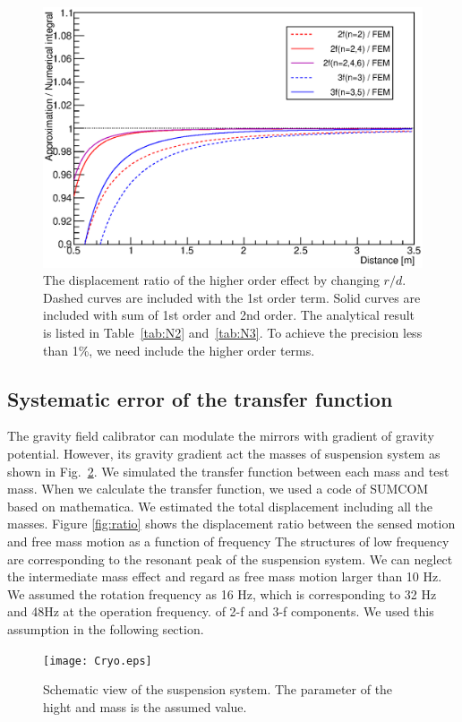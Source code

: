 \documentclass[A4]{spie}  %
\begin{document}
\begin{figure}
\begin{center}
\includegraphics[width=12cm]{dvsx_ratio.eps}
\caption{The displacement ratio of the higher order effect by changing $r/d$. Dashed curves are included with the 1st order term. Solid curves are included with sum of 1st order and 2nd order. The analytical result is listed in Table~\ref{tab:N2} and~\ref{tab:N3}. To achieve the precision less than 1\%, we need include the higher order terms.}
\label{fig:FEM}
\end{center}
\end{figure}


\subsection{Systematic error of the transfer function}
The gravity field calibrator can modulate the mirrors with gradient of gravity potential. However, its gravity gradient act the masses of suspension system as shown in Fig.~\ref{fig:cryo}. We simulated the transfer function between each mass and test mass. When we calculate the transfer function, we used a code of SUMCOM based on mathematica. We estimated the total displacement including all the masses. Figure \ref{fig:ratio} shows the displacement ratio between the sensed motion and free mass motion as a function of frequency The structures of low frequency are corresponding to the resonant peak of the suspension system. We can neglect the intermediate mass effect and regard as free mass motion larger than 10 Hz. We assumed the rotation frequency as 16 Hz, which is corresponding to 32 Hz and 48Hz at the operation frequency. of 2-f and 3-f components.  We used this assumption in the following section.
\begin{figure}
\begin{center}
\texttt{[image: Cryo.eps]}
\caption{Schematic view of the suspension system. The parameter of the hight and mass is the assumed value. }
\label{fig:cryo}
\end{center}
\end{figure}
\end{document}

